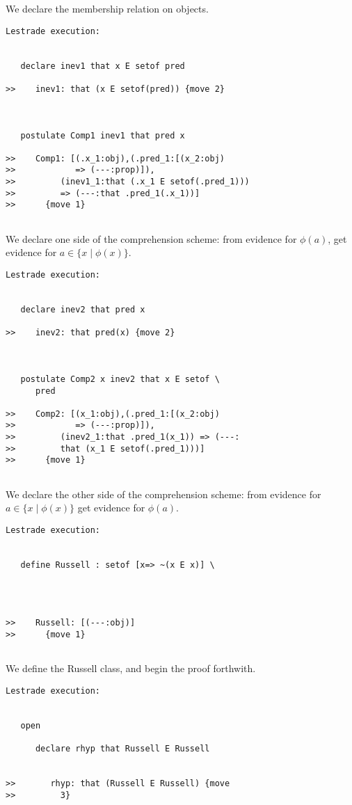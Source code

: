 \documentclass{article}
\begin{document}
We declare the membership relation on objects.

\begin{verbatim}Lestrade execution:


   declare inev1 that x E setof pred

>>    inev1: that (x E setof(pred)) {move 2}



   postulate Comp1 inev1 that pred x

>>    Comp1: [(.x_1:obj),(.pred_1:[(x_2:obj)
>>            => (---:prop)]),
>>         (inev1_1:that (.x_1 E setof(.pred_1)))
>>         => (---:that .pred_1(.x_1))]
>>      {move 1}


\end{verbatim}

We declare one side of the comprehension scheme:  from evidence for $\phi(a)$, get evidence for $a \in \{x \mid \phi(x)\}$.

\begin{verbatim}Lestrade execution:


   declare inev2 that pred x

>>    inev2: that pred(x) {move 2}



   postulate Comp2 x inev2 that x E setof \
      pred

>>    Comp2: [(x_1:obj),(.pred_1:[(x_2:obj)
>>            => (---:prop)]),
>>         (inev2_1:that .pred_1(x_1)) => (---:
>>         that (x_1 E setof(.pred_1)))]
>>      {move 1}


\end{verbatim}

We declare the other side of the comprehension scheme:  from evidence for $a \in \{x \mid \phi(x)\}$ get evidence for $\phi(a)$.

\begin{verbatim}Lestrade execution:


   define Russell : setof [x=> ~(x E x)] \
      



>>    Russell: [(---:obj)]
>>      {move 1}


\end{verbatim}

We define the Russell class, and begin the proof forthwith.

\begin{verbatim}Lestrade execution:


   open

      declare rhyp that Russell E Russell


>>       rhyp: that (Russell E Russell) {move
>>         3}


\end{verbatim}
\end{document}
